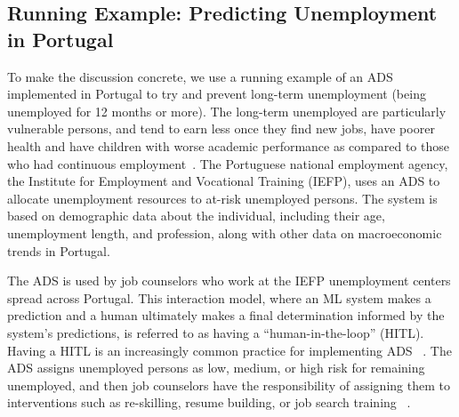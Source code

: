 
\subsection{Running Example: Predicting Unemployment in Portugal}

To make the discussion concrete, we use a running example of an ADS implemented in Portugal to try and prevent long-term unemployment (being unemployed for 12 months or more). The long-term unemployed are particularly vulnerable persons, and tend to earn less once they find new jobs, have poorer health and have children with worse academic performance as compared to those who had continuous employment~\cite{nichols2013consequences}. The Portuguese national employment agency, the Institute for Employment and Vocational Training (IEFP), uses an ADS to allocate unemployment resources to at-risk unemployed persons. The system is based on demographic data about the individual, including their age, unemployment length, and profession, along with other data on macroeconomic trends in Portugal.

The ADS is used by job counselors who work at the IEFP unemployment centers spread across Portugal. This interaction model, where an ML system makes a prediction and a human ultimately makes a final determination informed by the system's predictions, is referred to as having a ``human-in-the-loop'' (HITL). Having a HITL is an increasingly common practice for implementing ADS ~\cite{gillingham2019can,wagner2019liable,raso2017displacement}. The ADS assigns unemployed persons as low, medium, or high risk for remaining unemployed, and then job counselors have the responsibility of assigning them to interventions such as re-skilling, resume building, or job search training ~\cite{zejnilovic2020algorithmic}.


